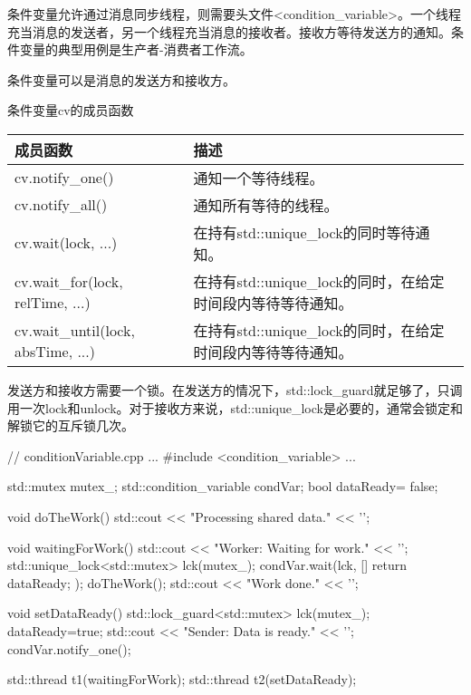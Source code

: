 条件变量允许通过消息同步线程，则需要头文件<condition\_variable>。一个线程充当消息的发送者，另一个线程充当消息的接收者。接收方等待发送方的通知。条件变量的典型用例是生产者-消费者工作流。

条件变量可以是消息的发送方和接收方。

\begin{center}
条件变量cv的成员函数
\end{center}

\begin{longtable}[c]{|l|l|}
\hline
\textbf{成员函数} & \textbf{描述}          \\ \hline
\endfirsthead
%
\endhead
%
cv.notify\_one()         & 通知一个等待线程。    \\ \hline
cv.notify\_all()         & 通知所有等待的线程。 \\ \hline
cv.wait(lock, ...)                 & 在持有std::unique\_lock的同时等待通知。                     \\ \hline
cv.wait\_for(lock, relTime, ...)   & 在持有std::unique\_lock的同时，在给定时间段内等待等待通知。 \\ \hline
cv.wait\_until(lock, absTime, ...) & 在持有std::unique\_lock的同时，在给定时间段内等待等待通知。        \\ \hline
\end{longtable}


发送方和接收方需要一个锁。在发送方的情况下，std::lock\_guard就足够了，只调用一次lock和unlock。对于接收方来说，std::unique\_lock是必要的，通常会锁定和解锁它的互斥锁几次。


\begin{cpp}
// conditionVariable.cpp
...
#include <condition_variable>
...

std::mutex mutex_;
std::condition_variable condVar;
bool dataReady= false;

void doTheWork(){
	std::cout << "Processing shared data." << '\n';
}

void waitingForWork(){
	std::cout << "Worker: Waiting for work." << '\n';
	std::unique_lock<std::mutex> lck(mutex_);
	condVar.wait(lck, []{ return dataReady; });
	doTheWork();
	std::cout << "Work done." << '\n';
}

void setDataReady(){
	std::lock_guard<std::mutex> lck(mutex_);
	dataReady=true;
	std::cout << "Sender: Data is ready." << '\n';
	condVar.notify_one();
}

std::thread t1(waitingForWork);
std::thread t2(setDataReady);
\end{cpp}


